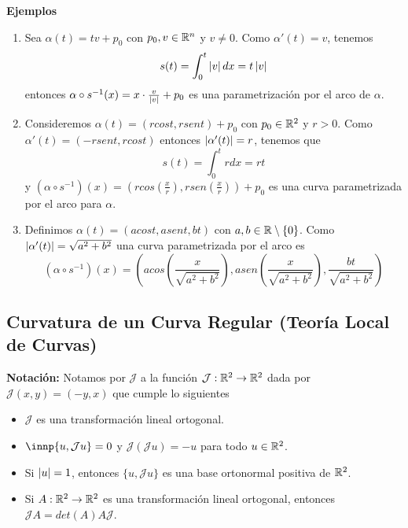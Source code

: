 \documentclass{article}
\begin{document}
\noindent\textbf{Ejemplos}
\begin{enumerate}
    \item Sea $\alpha(t)=tv+p_{0}$ con $p_{0},v\in\mathbb{R}^{n}$ y $v\neq0$. Como $\alpha'(t)=v$, tenemos
    \begin{equation*}
        s(t)=\int_{0}^{t}\left|v \right|dx=t\left|v \right|
    \end{equation*}
    entonces $\alpha\circ s^{-1}(x)=x\cdot\frac{v}{\left|v \right|}+p_{0}$ es una parametrización por el
    arco de $\alpha$.

    \item Consideremos $\alpha(t)=(rcost,rsent)+p_{0}$ con $p_{0}\in\mathbb{R}^{2}$ y $r>0$. Como 
    $\alpha'(t)=(-rsent,rcost)$ entonces $\left|\alpha'(t) \right|=r$, tenemos que
    \begin{equation*}
        s(t)=\int_{0}^{t}rdx=rt
    \end{equation*}
    y $(\alpha\circ s^{-1})(x)=(rcos(\frac{x}{r}),rsen(\frac{x}{r}))+p_{0}$ es una curva 
    parametrizada por el arco para $\alpha$.

    \item Definimos $\alpha(t)=(acost,asent,bt)$ con $a,b\in\mathbb{R}\setminus\{0\}$. Como $\left|\alpha'(t) \right|=\sqrt{a^{2}+b^{2}}$ una curva parametrizada por el arco es
    \begin{equation*}
        (\alpha\circ s^{-1})(x)=\left(acos\left(\frac{x}{\sqrt{a^{2}+b^{2}}}\right),
        asen\left(\frac{x}{\sqrt{a^{2}+b^{2}}}\right),\frac{bt}{\sqrt{a^{2}+b^{2}}}\right)
    \end{equation*}
\end{enumerate}

\subsection{Curvatura de un Curva Regular (Teoría Local de Curvas)}

\noindent\textbf{Notación:} Notamos por $\mathcal{J}$ a la función $\mathcal{J}:\mathbb{R}^{2}\to\mathbb{R}^{2}$
dada por $\mathcal{J}(x,y)=(-y,x)$ que cumple lo siguientes

\begin{itemize}
    \item $\mathcal{J}$ es una transformación lineal ortogonal.
    \item $\innp{u,\mathcal{J}u}=0$ y $\mathcal{J}(\mathcal{J}u)=-u$ para todo $u\in\mathbb{R}^{2}$.
    \item Si $\left|u \right|=1$, entonces $\{u,\mathcal{J}u\}$ es una base ortonormal positiva de 
    $\mathbb{R}^{2}$.
    \item Si $A:\mathbb{R}^{2}\to\mathbb{R}^{2}$ es una transformación lineal ortogonal, entonces 
    $\mathcal{J}A=det(A)A\mathcal{J}$.
\end{itemize}
\end{document}
